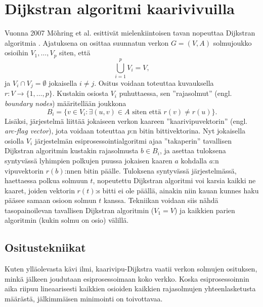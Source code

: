 \documentclass[finnish]{tktltiki2}
\theoremstyle{definition}
\theoremstyle{remark}
\begin{document}
\section{Dijkstran algoritmi kaarivivuilla}
Vuonna 2007 Möhring et al. esittivät mielenkiintoisen tavan nopeuttaa Dijkstran algoritmia \cite{Mohring07}. Ajatuksena on osittaa suunnatun verkon $G=(V, A)$ solmujoukko osioihin $V_1, \dots, V_p$ siten, että
\[
\bigcup_{i = 1}^p V_i = V,
\]
ja $V_i \cap V_j = \emptyset$ jokaisella $i \neq j$. Ositus voidaan toteuttaa kuvauksella $r \colon V \to \{1, \dots, p\}$. Kustakin osiosta $V_i$ puhuttaessa, sen ''rajasolmut'' (engl. \textit{boundary nodes}) määritellään joukkona
\[
B_i = \{ v \in V_i \colon \exists(u, v) \in A \text{ siten että } r(v) \neq r(u) \}.
\]
Lisäksi, järjestelmä liittää jokaiseen verkon kaareen ''kaarivipuvektorin'' (engl. \textit{arc-flag vector}), jota voidaan toteuttaa $p$:n bitin bittivektorina. Nyt jokaisella osiolla $V_i$ järjestelmän esiprosessointialgoritmi ajaa ''takaperin'' tavallisen Dijkstran algoritmin kustakin rajasolmusta $b \in B_i$, ja asettaa tuloksena syntyvässä lyhimpien polkujen puussa jokaisen kaaren $a$ kohdalla $a$:n vipuvektorin $r(b)$:nnen bitin päälle. Tuloksena syntyvässä järjestelmässä, haettaessa polkua solmuun $t$, nopeutettu Dijkstran algoritmi voi karsia kaikki ne kaaret, joiden vektorin $r(t)$:s bitti ei ole päällä, ainakin niin kauan kunnes haku pääsee samaan osioon solmun $t$ kanssa. Tekniikan voidaan siis nähdä tasopainoilevan tavallisen Dijkstran algoritmin ($V_1 = V$) ja kaikkien parien algoritmin (kukin solmu on osio) välillä.

\subsection{Ositustekniikat}
 Kuten ylläolevasta kävi ilmi, kaarivipu-Dijkstra vaatii verkon solmujen osituksen, minkä jälkeen joudutaan esiprosessoimaan koko verkko. Koska esiprosessoinnin aika riipuu lineaarisesti kaikkien osioiden kaikkien rajasolmujen yhteenlasketusta määrästä, jälkimmäisen minimointi on toivottavaa. 
 
\end{document}

